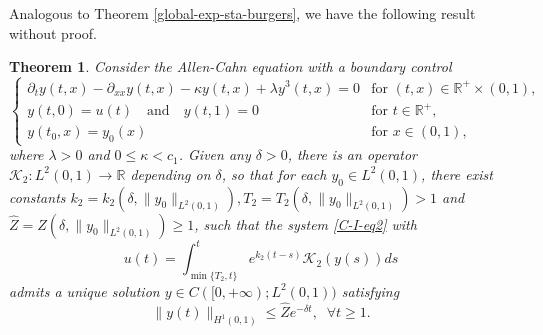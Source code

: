 \documentclass[review]{elsarticle}
\newtheorem{theorem}{Theorem}[section]
\numberwithin{equation}{section}
\begin{document}
Analogous to {Theorem \ref{global-exp-sta-burgers}}, we have the following result without proof.
\begin{theorem}
    Consider the Allen-Cahn equation with a boundary control
    \begin{equation}
    \label{C-I-eq2}
\left\{\begin{array}{ll}
\partial_t y(t,x)-\partial_{xx}y(t,x)-\kappa y(t,x) +\lambda y^3 (t,x)=0 & \text{for }(t,x)\in \mathbb{R}^+\times (0,1),\\[2mm]
y( t,0)=u(t)\quad\text{and}\quad y( t,1)=0& \text{for }t\in \mathbb{R}^+,\\[2mm]
y(t_0,x)=y_0(x)& \text{for }x\in (0,1),
\end{array}\right.
\end{equation}
where $\lambda>0$ and $0\le \kappa< c_1 $. Given any $\delta>0$, there is an operator $\mathcal{K}_2:L^2(0,1)\to \mathbb{R}$ depending on $\delta$, so that for each $y_0\in L^2(0,1)$, there exist constants ${k}_2=k_2\left(\delta,\|y_0\|_{L^2(0,1)}\right),{T}_2=T_2\left(\delta,\|y_0\|_{L^2(0,1)}\right)>1$ and $\hat{Z}=\hat{Z}\left(\delta,\|y_0\|_{L^2(0,1)}\right)\ge 1$, such that the system \eqref{C-I-eq2} with 
$${u}(t)=\int_{\min\{{T}_2,t\}}^t e^{k_2(t-s)}{\mathcal{K}}_2(y(s))ds$$ 
admits a unique solution $y\in C([0,+\infty);L^2(0,1))$ satisfying
\begin{equation*}
    \|y(t)\|_{H^1(0,1)}\le \hat{Z}e^{-\delta t}, \;\;\forall t\ge 1.
\end{equation*}
\end{theorem}
\end{document}
